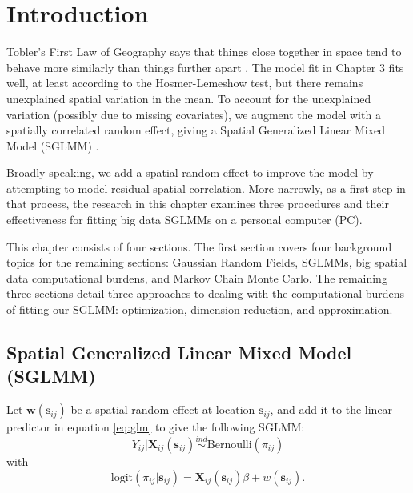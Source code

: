 \section{Introduction} %

Tobler's First Law of Geography says that things close together in space tend to behave more similarly than things further apart \citep{Tobler1970}. The model fit in Chapter 3 fits well, at least according to the Hosmer-Lemeshow test, but there remains unexplained spatial variation in the mean. To account for the unexplained variation (possibly due to missing covariates), we augment the model with a spatially correlated random effect, giving a Spatial Generalized Linear Mixed Model (SGLMM) \citep{Banerjee2008}.

Broadly speaking, we add a spatial random effect to improve the model by attempting to model residual spatial correlation. More narrowly, as a first step in that process, the research in this chapter examines three procedures and their effectiveness for fitting big data SGLMMs on a personal computer (PC).

This chapter consists of four sections. The first section covers four background topics for the remaining sections: Gaussian Random Fields, SGLMMs, big spatial data computational burdens, and Markov Chain Monte Carlo. The remaining three sections detail three approaches to dealing with the computational burdens of fitting our SGLMM: optimization, dimension reduction, and approximation.

\subsection{Spatial Generalized Linear Mixed Model (SGLMM)} %
Let $\pmb{w}(\pmb{s}_{ij})$ be a spatial random effect at location $\pmb{s}_{ij}$, and add it to the linear predictor in equation \ref{eq:glm} to give the following SGLMM:
\begin{equation}
Y_{ij}|\mathbf{X}_{ij}(\mathbf{s}_{ij}) \stackrel{ind}{\sim} \mbox{Bernoulli}(\pi_{ij}) 
\end{equation}
with
\begin{equation} \text{logit}(\pi_{ij}|\pmb{s}_{ij}) = \mathbf{X}_{ij}(\mathbf{s}_{ij})\beta + w(\pmb{s}_{ij}). 
\end{equation}

